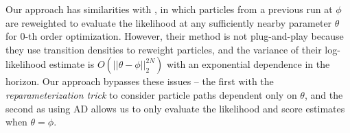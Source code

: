 \documentclass[numsec,webpdf,modern,medium,namedate]{oup-authoring-template}
\theoremstyle{thmstyleone}%
\theoremstyle{thmstyletwo}%
\theoremstyle{thmstylethree}%
\begin{document}
Our approach has similarities with \cite{svensson18}, in which particles from a previous run at $\phi$ are reweighted to evaluate the likelihood at any sufficiently nearby parameter $\theta$ for $0$-th order optimization.
However, their method is not plug-and-play because they use transition densities to reweight particles, and the variance of their log-likelihood estimate is $O(||\theta - \phi||_2^{2N})$ with an exponential dependence in the horizon. Our approach bypasses these issues -- the first with the \textit{reparameterization trick} to consider particle paths dependent only on $\theta$, and the second as using AD allows us to only evaluate the likelihood and score estimates when $\theta=\phi$. 

\end{document}
